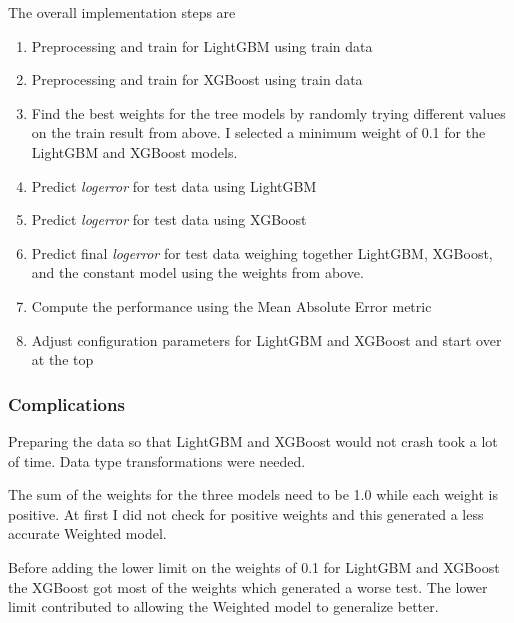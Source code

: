 \documentclass[a4paper]{article}
\begin{document}
The overall implementation steps are
\begin{enumerate}
    \item Preprocessing and train for LightGBM using train data
    \item Preprocessing and train for XGBoost using train data
    \item Find the best weights for the tree models by randomly trying different values on the train result from above. I selected a minimum weight of 0.1 for the LightGBM and XGBoost models.
    \item Predict \textit{logerror} for test data using LightGBM
    \item Predict \textit{logerror} for test data using XGBoost
    \item Predict final \textit{logerror} for test data weighing together LightGBM, XGBoost, and the constant model using the weights from above.
    \item Compute the performance using the Mean Absolute Error metric
    \item Adjust configuration parameters for LightGBM and XGBoost and start over at the top
\end{enumerate}


\subsubsection{Complications}
Preparing the data so that LightGBM and XGBoost would not crash took a lot of time. Data type transformations were needed.

The sum of the weights for the three models need to be 1.0 while each weight is positive. At first I did not check for positive weights and this generated a less accurate Weighted model. 

Before adding the lower limit on the weights of 0.1 for LightGBM and XGBoost the XGBoost got most of the weights which generated a worse test. The lower limit contributed to allowing the Weighted model to generalize better.
\end{document}
